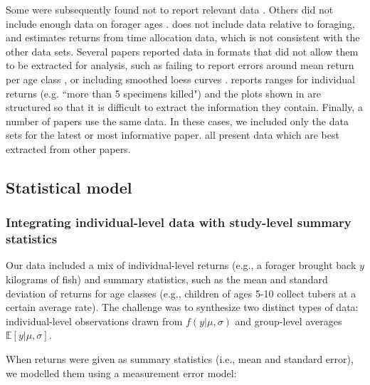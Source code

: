 Some were subsequently found not to report relevant data \citep{blurton_jones_foraging_1994, kraft_foraging_2019}. 
Others did not include enough data on forager ages \citep{bird_children_2002, hagino_high_2016, hooper_skills_2015, kramer_early_2009}.   
\citet{kramer_production_2005} does not include data relative to foraging, and \citet{kramer_does_2009} estimates returns from time allocation data, which is not consistent with the other data sets.  
Several papers reported data in formats that did not allow them to be extracted for analysis, such as failing to report errors around mean return per age class \citep{kaplan_evolution_1997, kaplan_theory_2000, kaplan_emergence_2002}, or including smoothed loess curves \citep{kaplan_evolutionary_1994, kaplan_theory_1996, kaplan_embodied_2003, marlowe_foraging_2010}. 
\citet{kawabe_development_1983} reports ranges for individual returns (e.g. ``more than 5 specimens killed") and the plots shown in \citet{koster_hunting_2007} are structured so that it is difficult to extract the information they contain.
Finally, a number of papers use the same data. In these cases, we included only the data sets for the latest or most informative paper. \citet{bird_ethnoarchaeology_2000, blurton_jones_lives_1993, crittenden_allomaternal_2009, kramer_evolution_2011, mcelreath_using_2014, pollom_changes_2020, walker_evolution_2004} all present data which are best extracted from other papers.


\subsection{Statistical model}\label{SI:model}

\subsubsection{Integrating individual-level data with study-level summary statistics}

Our data included a mix of individual-level returns (e.g., a forager brought back $y$ kilograms of fish) and summary statistics, such as the mean and standard deviation of returns for age classes (e.g., children of  ages 5-10 collect tubers at a certain average rate). The challenge was to synthesize two distinct types of data: individual-level observations drawn from $f(y|\mu,\sigma)$ and group-level averages $\mathbb{E}[y|\mu,\sigma]$.

When returns were given as summary statistics (i.e., mean and standard error), we modelled them using a measurement error model:

